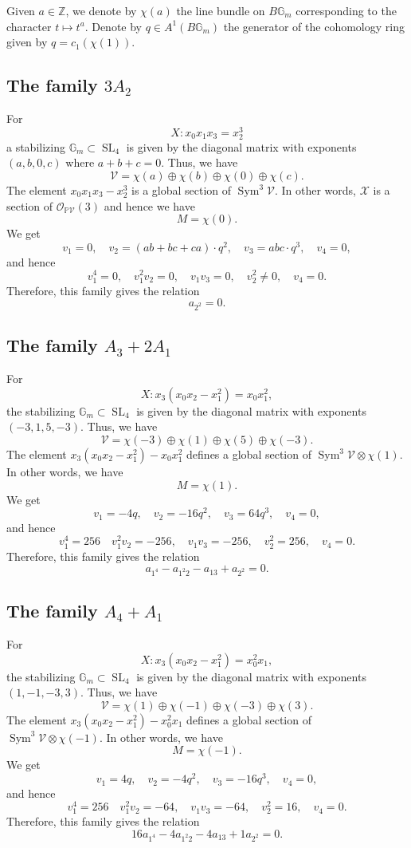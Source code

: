 \documentclass[12 pt]{amsart}
\renewcommand{\P}{\mathbb{P}}
\newcommand{\SL}{\operatorname{SL}}
\newcommand{\<}{\left\langle}
\renewcommand{\>}{\right\rangle}
\DeclareMathOperator{\sym}{Sym}
\begin{document}
Given $a \in \mathbb Z$, we denote by $\chi(a)$ the line bundle on $B\mathbb G_m$ corresponding to the character $t \mapsto t^a$.
Denote by $q \in A^1(B\mathbb G_m)$ the generator of the cohomology ring given by $q = c_1(\chi(1))$.
\subsection{The family $3A_2$}
For
\[ X: x_0x_1x_3 = x_2^3\]
a stabilizing $\mathbb G_m \subset \SL_4$ is given by the diagonal matrix with exponents $(a,b,0,c)$ where $a+b+c = 0$.
Thus, we have
\[\mathcal V = \chi(a) \oplus \chi(b) \oplus \chi(0) \oplus \chi(c).\]
The element $x_0x_1x_3 - x_2^3$ is a global section of $\sym^3 \mathcal V$.
In other words, $\mathcal X$ is a section of $\mathcal O_{\P \mathcal V}(3)$ and hence we have
\[ M = \chi(0).\]
We get
\[ v_1 = 0, \quad v_2 = (ab+bc+ca) \cdot q^2, \quad v_3 = abc \cdot q^3, \quad v_4 = 0,\]
and hence
\[ v_1^4 = 0, \quad v_1^2v_2 = 0, \quad v_1v_3 = 0,\quad v_2^2 \neq 0, \quad v_4 = 0.\]
Therefore, this family gives the relation
\begin{equation}\label{eqn:iso1}
  a_{2^2} = 0.
\end{equation}

\subsection{The family $A_3 + 2A_1$}
For
\[ X: x_3(x_0x_2-x_1^2) = x_0x_1^2,\]
the stabilizing $\mathbb G_m \subset \SL_4$ is given by the diagonal matrix with exponents $(-3,1,5,-3)$.
Thus, we have
\[ \mathcal V = \chi(-3) \oplus \chi(1) \oplus \chi(5) \oplus \chi(-3).\]
The element $x_3(x_0x_2-x_1^2) - x_0x_1^2$ defines a global section of $\sym^3 \mathcal V \otimes \chi(1)$.
In other words, we have
\[ M = \chi(1).\]
We get
\[ v_1 = -4q, \quad v_2 = -16q^2, \quad v_3 = 64q^3, \quad v_4 = 0,\]
and hence
\[ v_1^4 = 256 \quad v_1^2v_2 = -256, \quad v_1v_3 = -256, \quad v_2^2 = 256, \quad v_4 = 0.\]
Therefore, this family gives the relation
\begin{equation}\label{eqn:iso2}
  a_{1^4} - a_{1^2 2}- a_{13} +  a_{2^2}  = 0.
\end{equation}

\subsection{The family $A_4 + A_1$}
For
\[ X: x_3(x_0x_2-x_1^2) = x_0^2x_1,\]
the stabilizing $\mathbb G_m \subset \SL_4$ is given by the diagonal matrix with exponents $(1,-1,-3,3)$.
Thus, we have
\[ \mathcal V = \chi(1) \oplus \chi(-1) \oplus \chi(-3) \oplus \chi(3).\]
The element $x_3(x_0x_2-x_1^2) - x^2_0x_1$ defines a global section of $\sym^3 \mathcal V \otimes \chi(-1)$.
In other words, we have
\[ M = \chi(-1).\]
We get
\[ v_1 = 4q, \quad v_2 = -4q^2, \quad v_3 = -16q^3, \quad v_4 = 0,\]
and hence
\[ v_1^4 = 256 \quad v_1^2v_2 = -64, \quad v_1v_3 = -64, \quad v_2^2 = 16, \quad v_4 = 0.\]
Therefore, this family gives the relation
\begin{equation}\label{eqn:iso3}
  16a_{1^4} -4a_{1^2 2}- 4a_{13} + 1 a_{2^2}  = 0.
\end{equation}
\end{document}
